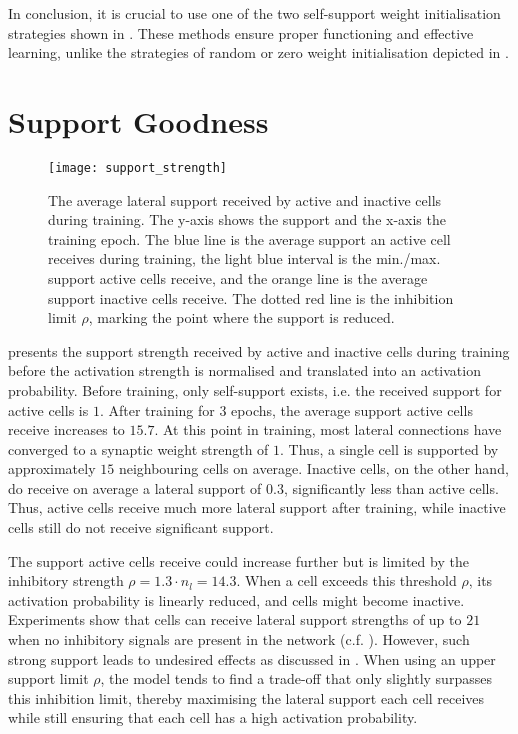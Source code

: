 In conclusion, it is crucial to use one of the two self-support weight initialisation strategies shown in . These methods ensure proper functioning and effective learning, unlike the strategies of random or zero weight initialisation depicted in .

\section{Support Goodness}
%
\begin{figure}[h]
    \centering
    \texttt{[image: support\_strength]}
    \caption[Average lateral support]{The average lateral support received by active and inactive cells during training. The y-axis shows the support and the x-axis the training epoch. The blue line is the average support an active cell receives during training, the light blue interval is the min./max. support active cells receive, and the orange line is the average support inactive cells receive. The dotted red line is the inhibition limit $\rho$, marking the point where the support is reduced.}
\end{figure}
%
 presents the support strength received by active and inactive cells during training before the activation strength is normalised and translated into an activation probability.
Before training, only self-support exists, i.e. the received support for active cells is $1$.
After training for $3$ epochs, the average support active cells receive increases to $15.7$.
At this point in training, most lateral connections have converged to a synaptic weight strength of $1$.
Thus, a single cell is supported by approximately $15$ neighbouring cells on average.
Inactive cells, on the other hand, do receive on average a lateral support of $0.3$, significantly less than active cells.
Thus, active cells receive much more lateral support after training, while inactive cells still do not receive significant support.

The support active cells receive could increase further but is limited by the inhibitory strength $\rho = 1.3\cdot n_l = 14.3$.
When a cell exceeds this threshold $\rho$, its activation probability is linearly reduced, and cells might become inactive.
Experiments show that cells can receive lateral support strengths of up to $21$ when no inhibitory signals are present in the network (c.f. ).
However, such strong support leads to undesired effects as discussed in .
When using an upper support limit $\rho$, the model tends to find a trade-off that only slightly surpasses this inhibition limit, thereby maximising the lateral support each cell receives while still ensuring that each cell has a high activation probability.

